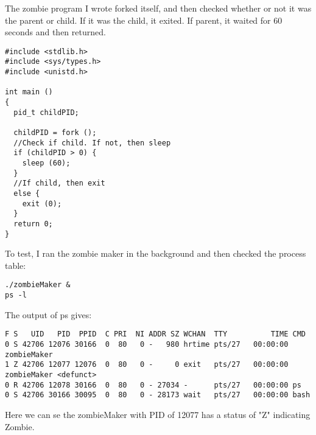 \documentclass[11pt]{report}
\begin{document}
The zombie program I wrote forked itself, and then checked whether or not it was the parent or child. If it was the child, it exited. If parent, it waited for 60 seconds and then returned.
\begin{verbatim}
#include <stdlib.h>
#include <sys/types.h>
#include <unistd.h>

int main ()
{
  pid_t childPID;

  childPID = fork ();
  //Check if child. If not, then sleep
  if (childPID > 0) {
    sleep (60);
  } 
  //If child, then exit
  else {
    exit (0);
  }
  return 0;
}
\end{verbatim}

To test, I ran the zombie maker in the background and then checked the process table:
\begin{verbatim}
./zombieMaker &
ps -l
\end{verbatim}


The output of ps gives:
\begin{verbatim}
F S   UID   PID  PPID  C PRI  NI ADDR SZ WCHAN  TTY          TIME CMD
0 S 42706 12076 30166  0  80   0 -   980 hrtime pts/27   00:00:00 zombieMaker
1 Z 42706 12077 12076  0  80   0 -     0 exit   pts/27   00:00:00 zombieMaker <defunct>
0 R 42706 12078 30166  0  80   0 - 27034 -      pts/27   00:00:00 ps
0 S 42706 30166 30095  0  80   0 - 28173 wait   pts/27   00:00:00 bash
\end{verbatim}
Here we can se the zombieMaker with PID of 12077 has a status of "Z" indicating Zombie.
\end{document}
